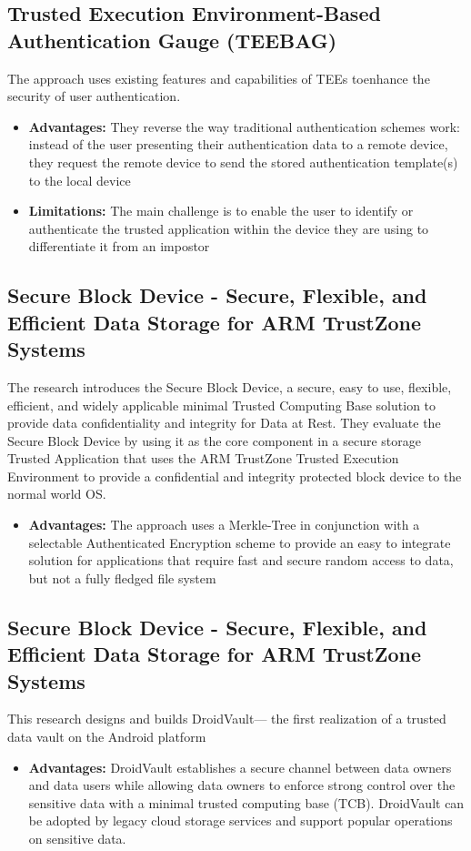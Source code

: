 \documentclass[conference]{IEEEtran}
\begin{document}
\subsection{Trusted Execution Environment-Based Authentication Gauge (TEEBAG)}
\cite{trust8} The approach uses existing features and capabilities of TEEs toenhance the security of user authentication.
\begin{itemize}
    \item \textbf{Advantages:}  They reverse the way traditional authentication schemes work: instead of the user presenting their authentication data to a remote device, they request the remote device to send the stored authentication template(s) to the local device
    \item \textbf{Limitations:} The main challenge is to enable the user to identify or authenticate the trusted application within the device they are using to differentiate it from an impostor
\end{itemize}


\subsection{Secure Block Device - Secure, Flexible, and Efficient Data Storage for ARM TrustZone Systems}
\cite{trust9} The research introduces the Secure Block Device, a secure, easy to use, flexible, efficient, and widely applicable minimal Trusted Computing Base solution to provide data confidentiality and integrity for Data at Rest. They evaluate the Secure Block Device by using it as the core component in a secure storage Trusted Application that uses the ARM TrustZone Trusted Execution Environment to provide a confidential and integrity protected block device to the normal world OS.
\begin{itemize}
    \item \textbf{Advantages:} The approach uses a Merkle-Tree in conjunction with a selectable Authenticated Encryption scheme to provide an easy to integrate solution for applications that require fast and secure random access to data, but not a fully fledged file system
\end{itemize}


\subsection{Secure Block Device - Secure, Flexible, and Efficient Data Storage for ARM TrustZone Systems}
\cite{trust10} This research designs and builds DroidVault— the first realization of a trusted data vault on the Android platform
\begin{itemize}
    \item \textbf{Advantages:} DroidVault establishes a secure channel between data owners and data users while allowing data owners to enforce strong control over the sensitive data with a minimal trusted computing base (TCB). DroidVault can be adopted by legacy cloud storage services and support popular operations on sensitive data.
\end{itemize}
\end{document}
